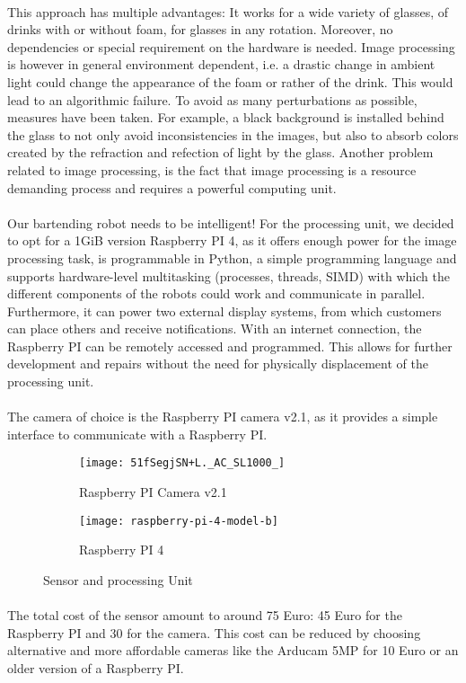\documentclass[11pt]{article}
\begin{document}
   \paragraph*{}
   This approach has multiple advantages: It works for a wide variety of glasses, of drinks with or without foam, for
   glasses in any rotation.
   Moreover, no dependencies or special requirement on the hardware is needed.
   Image processing is however in general environment dependent, i.e. a drastic change in ambient light could change the
   appearance of the foam or rather of the drink.
   This would lead to an algorithmic failure.
   To avoid as many perturbations as possible, measures have been taken.
   For example, a black background is installed behind the glass to not only avoid inconsistencies in the images, but also
   to absorb colors created by the refraction and refection of light by the glass.
   Another problem related to image processing, is the fact that image processing is a resource demanding process and
   requires a powerful computing unit.

   \paragraph*{}
    Our bartending robot needs to be intelligent!
    For the processing unit, we decided to opt for a 1GiB version Raspberry PI 4, as it offers enough power for the image
    processing task, is programmable in Python, a simple programming language and supports hardware-level multitasking
    (processes, threads, SIMD) with which the different components of the robots could work and communicate in
    parallel.
    Furthermore, it can power two external display systems, from which customers can place others and receive notifications.
    With an internet connection, the Raspberry PI can be remotely accessed and programmed.
    This allows for further development and repairs without the need for physically displacement of the processing unit.

    \paragraph*{}
    The camera of choice is the Raspberry PI camera v2.1, as it provides a simple interface to communicate with a
    Raspberry PI.

    \begin{figure}
        \centering
        \begin{subfigure}[b]{0.4\textwidth}
            \centering
            \texttt{[image: 51fSegjSN+L.\_AC\_SL1000\_]}
            \caption{Raspberry PI Camera v2.1}
        \end{subfigure}
        \begin{subfigure}[b]{0.4\textwidth}
            \centering
            \texttt{[image: raspberry-pi-4-model-b]}
            \caption{Raspberry PI 4}
        \end{subfigure}
        \caption{Sensor and processing Unit}
        \label{fig:figure3}
    \end{figure}

    \paragraph*{}
    The total cost of the sensor amount to around 75 Euro: 45 Euro for the Raspberry PI and 30 for the camera.
    This cost can be reduced by choosing alternative and more affordable cameras like the Arducam 5MP for 10 Euro or an older
    version of a Raspberry PI.
\end{document}
